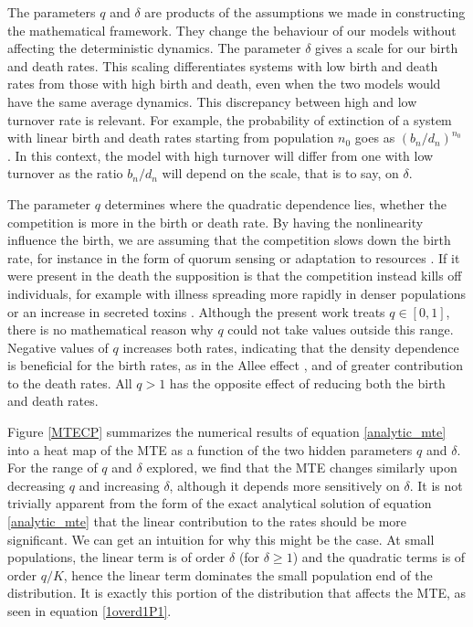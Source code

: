 The parameters $q$ and $\delta$ are products of the assumptions we made in constructing the mathematical framework.
They change the behaviour of our models without affecting the deterministic dynamics.
The parameter $\delta$ gives a scale for our birth and death rates.
This scaling differentiates systems with low birth and death rates from those with high birth and death, even when the two models would have the same average dynamics.
This discrepancy between high and low turnover rate is relevant. 
For example, the probability of extinction of a system with linear birth and death rates starting from population $n_0$ goes as $(b_n/d_n)^{n_0}$ \cite{Nisbet1982}. 
In this context, the model with high turnover will differ from one with low turnover as the ratio $b_n/d_n$ will depend on the scale, that is to say, on $\delta$.

The parameter $q$ determines where the quadratic dependence lies, whether the competition is more in the birth or death rate.
By having the nonlinearity influence the birth, we are assuming that the competition slows down the birth rate, for instance in the form of quorum sensing \cite{Nadell2008} or adaptation to resources \cite{Vulic2001}. %
If it were present in the death the supposition is that the competition instead kills off individuals, for example with illness spreading more rapidly in denser populations \cite{Greenhalgh1990} or an increase in secreted toxins \cite{VanMelderen2009,Rankin2012}.
Although the present work treats $q \in [0,1]$, there is no mathematical reason why $q$ could not take values outside this range.
Negative values of $q$ increases both rates, indicating that the density dependence is beneficial for the birth rates, as in the Allee effect \cite{Chesson2000,Assaf2016}, and of greater contribution to the death rates.
All $q>1$ has the opposite effect of reducing both the birth and death rates. %

Figure \ref{MTECP} summarizes the numerical results of equation \ref{analytic_mte} into a heat map of the MTE as a function of the two hidden parameters $q$ and $\delta$.
For the range of $q$ and $\delta$ explored, we find that the MTE changes similarly upon decreasing $q$ and increasing $\delta$, although it depends more sensitively on $\delta$.
It is not trivially apparent from the form of the exact analytical solution of equation \ref{analytic_mte} that the linear contribution to the rates should be more significant.
We can get an intuition for why this might be the case.
At small populations, the linear term is of order $\delta$ (for $\delta \geq 1$) and the quadratic terms is of order $q/K$, hence the linear term dominates the small population end of the distribution.
It is exactly this portion of the distribution that affects the MTE, as seen in equation \ref{1overd1P1}.

